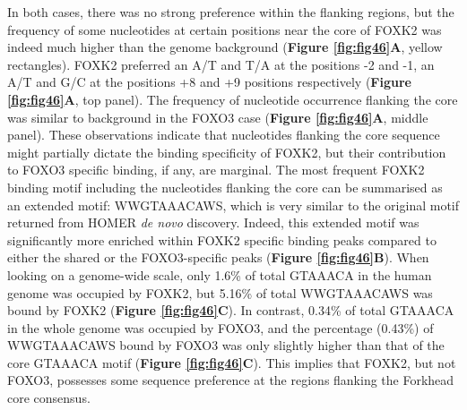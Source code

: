 In both cases, there was no strong preference within the flanking regions, but the frequency of some nucleotides at certain positions near the core of FOXK2 was indeed much higher than the genome background (\textbf{Figure \ref{fig:fig46}A}, yellow rectangles). FOXK2 preferred an A/T and T/A at the positions -2 and -1, an A/T and G/C at the positions +8 and +9 positions respectively (\textbf{Figure \ref{fig:fig46}A}, top panel). The frequency of nucleotide occurrence flanking the core was similar to background in the FOXO3 case (\textbf{Figure \ref{fig:fig46}A}, middle panel). These observations indicate that nucleotides flanking the core sequence might partially dictate the binding specificity of FOXK2, but their contribution to FOXO3 specific binding, if any, are marginal. The most frequent FOXK2 binding motif including the nucleotides flanking the core can be summarised as an extended motif: WWGTAAACAWS, which is very similar to the original motif returned from HOMER \textit{de novo} discovery. Indeed, this extended motif was significantly more enriched within FOXK2 specific binding peaks compared to either the shared or the FOXO3-specific peaks (\textbf{Figure \ref{fig:fig46}B}). When looking on a genome-wide scale, only 1.6\% of total GTAAACA in the human genome was occupied by FOXK2, but 5.16\% of total WWGTAAACAWS was bound by FOXK2 (\textbf{Figure \ref{fig:fig46}C}). In contrast, 0.34\% of total GTAAACA in the whole genome was occupied by FOXO3, and the percentage (0.43\%) of WWGTAAACAWS bound by FOXO3 was only slightly higher than that of the core GTAAACA motif (\textbf{Figure \ref{fig:fig46}C}). This implies that FOXK2, but not FOXO3, possesses some sequence preference at the regions flanking the Forkhead core consensus.


